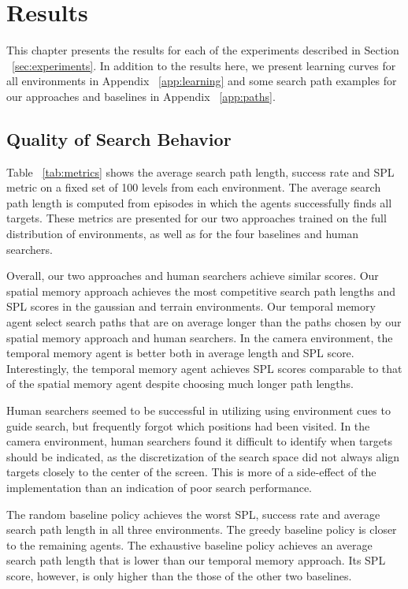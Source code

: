 \chapter{Results}
\label{cha:results}

This chapter presents the results for each of the experiments described in Section ~\ref{sec:experiments}.
In addition to the results here, we present learning curves for all environments in Appendix ~\ref{app:learning} and some search path examples for our approaches and baselines in Appendix ~\ref{app:paths}.

\section{Quality of Search Behavior}

Table ~\ref{tab:metrics} shows the average search path length, success rate and SPL metric on a fixed set of 100 levels from each environment.
The average search path length is computed from episodes in which the agents successfully finds all targets.
These metrics are presented for our two approaches trained on the full distribution of environments, as well as for the four baselines and human searchers.

Overall, our two approaches and human searchers achieve similar scores.
Our spatial memory approach achieves the most competitive search path lengths and SPL scores in the gaussian and terrain environments.
Our temporal memory agent select search paths that are on average longer than the paths chosen by our spatial memory approach and human searchers.
In the camera environment, the temporal memory agent is better both in average length and SPL score.
Interestingly, the temporal memory agent achieves SPL scores comparable to that of the spatial memory agent despite choosing much longer path lengths.

Human searchers seemed to be successful in utilizing using environment cues to guide search, but frequently forgot which positions had been visited.
In the camera environment, human searchers found it difficult to identify when targets should be indicated,
as the discretization of the search space did not always align targets closely to the center of the screen.
This is more of a side-effect of the implementation than an indication of poor search performance.

The random baseline policy achieves the worst SPL, success rate and average search path length in all three environments.
The greedy baseline policy is closer to the remaining agents.
The exhaustive baseline policy achieves an average search path length that is lower than our temporal memory approach.
Its SPL score, however, is only higher than the those of the other two baselines.

